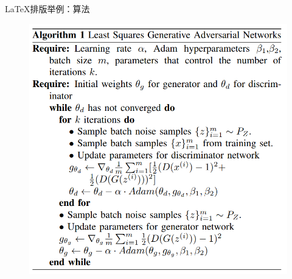 \documentclass[UTF8,11pt]{ctexbeamer}
\begin{document}
\begin{frame}{\LaTeX 排版举例：算法}
\begin{figure}
	\includegraphics[scale=0.4]{figure/Algorithm.png}
\end{figure}
\end{frame}
\end{document}
